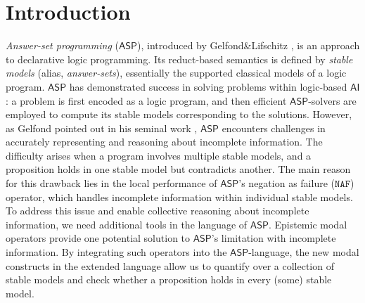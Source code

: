 \documentclass[submission,copyright,creativecommons]{eptcs}
\newcommand{\logic}[1]  { \ensuremath{\mathsf{#1}} }
\newcommand{\ASP}  { \logic{ASP} }
\newcommand{\AI}  { \logic{AI} }
\begin{document}
\section{Introduction}
\label{sec:Introduction}
\emph{Answer-set programming} ($\ASP$), introduced by Gelfond\&Lifschitz
\cite{GelfondL88,GelfondL91}, is an approach to declarative logic programming. Its reduct-based semantics is defined by \emph{stable models} (alias, \emph{answer-sets}),
essentially the supported classical models of a logic program.
%
$\ASP$ has demonstrated success
in solving problems within logic-based $\AI$: a problem is first encoded
as a logic program, and then efficient $\ASP$-solvers are
employed to compute its stable models corresponding to the solutions.
However, as Gelfond pointed out in his seminal work \cite{Gelfond91strong},  
$\ASP$ encounters challenges in accurately representing and 
reasoning about incomplete information. The difficulty
arises when a program involves multiple stable models, and
a proposition holds in one stable model but contradicts another. 
The main reason for this drawback lies in the local performance of $\ASP$'s negation as failure ($\texttt{NAF}$) operator, 
which handles incomplete information within individual stable models.
To address this issue and
enable collective reasoning about incomplete information,
we need additional tools in the language of $\ASP$.
Epistemic modal operators provide one potential solution to $\ASP$'s limitation 
with incomplete information. By integrating such operators
into the $\ASP$-language, the new modal constructs in the extended language allow us
to quantify over a collection of stable models and check whether a proposition
holds in every (some) stable model.
\end{document}
